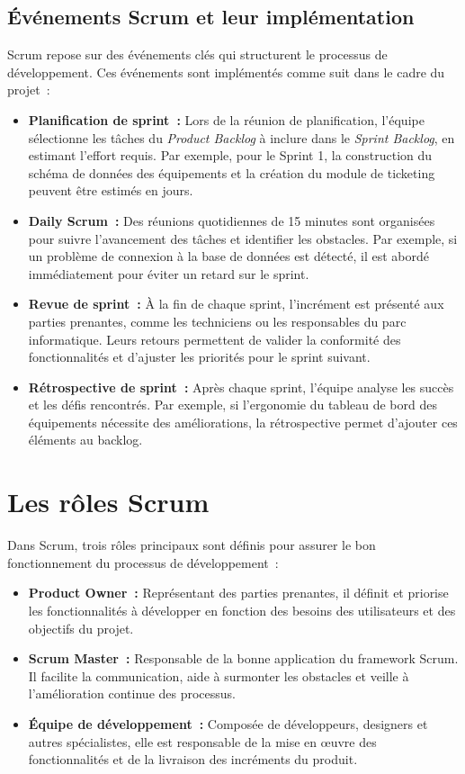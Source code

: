 \subsection{Événements Scrum et leur implémentation}
\label{subsec:evenements_scrum}
Scrum repose sur des événements clés qui structurent le processus de développement. Ces événements sont implémentés comme suit dans le cadre du projet~\cite{schwaber2004}:
\begin{itemize}
    \item \textbf{Planification de sprint~:} Lors de la réunion de planification, l’équipe sélectionne les tâches du \textit{Product Backlog} à inclure dans le \textit{Sprint Backlog}, en estimant l’effort requis. Par exemple, pour le Sprint 1, la construction du schéma de données des équipements et la création du module de ticketing peuvent être estimés en jours.

    \item \textbf{Daily Scrum~:} Des réunions quotidiennes de 15 minutes sont organisées pour suivre l’avancement des tâches et identifier les obstacles. Par exemple, si un problème de connexion à la base de données est détecté, il est abordé immédiatement pour éviter un retard sur le sprint.

    \item \textbf{Revue de sprint~:} À la fin de chaque sprint, l’incrément est présenté aux parties prenantes, comme les techniciens ou les responsables du parc informatique. Leurs retours permettent de valider la conformité des fonctionnalités et d’ajuster les priorités pour le sprint suivant.

    \item \textbf{Rétrospective de sprint~:} Après chaque sprint, l’équipe analyse les succès et les défis rencontrés. Par exemple, si l’ergonomie du tableau de bord des équipements nécessite des améliorations, la rétrospective permet d’ajouter ces éléments au backlog.
\end{itemize}

\section{Les rôles Scrum}
\label{sec:roles_scrum}
Dans Scrum, trois rôles principaux sont définis pour assurer le bon fonctionnement du processus de développement~\cite{atlassian2023roles}:

\begin{itemize}
    \item \textbf{Product Owner~:} Représentant des parties prenantes, il définit et priorise les fonctionnalités à développer en fonction des besoins des utilisateurs et des objectifs du projet.
    \item \textbf{Scrum Master~:} Responsable de la bonne application du framework Scrum. Il facilite la communication, aide à surmonter les obstacles et veille à l’amélioration continue des processus.
    \item \textbf{Équipe de développement~:} Composée de développeurs, designers et autres spécialistes, elle est responsable de la mise en œuvre des fonctionnalités et de la livraison des incréments du produit.
\end{itemize}

